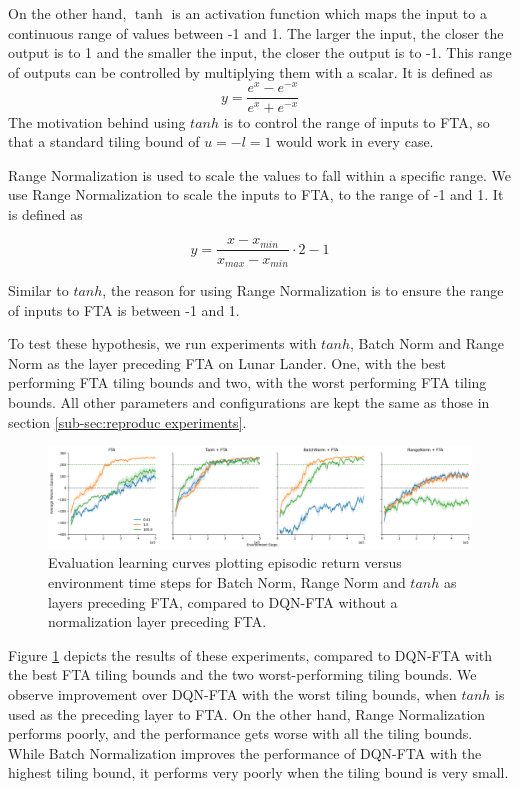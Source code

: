 \documentclass{article}
\begin{document}
On the other hand, $\tanh$ is an activation function which maps the input to a continuous range of values between -1 and 1.
The larger the input, the closer the output is to 1 and the smaller the input, the closer the output is to -1.
This range of outputs can be controlled by multiplying them with a scalar.
It is defined as
 \begin{equation}
    y = \frac{e^x-e^{-x}}{e^x+e^{-x}}
    \label{eq:tanh}
 \end{equation}
The motivation behind using $tanh$ is to control the range of inputs to FTA, so that a standard tiling bound of $u = -l = 1$ would work in every case.

Range Normalization is used to scale the values to fall within a specific range.
We use Range Normalization to scale the inputs to FTA, to the range of -1 and 1. It is defined as

 \begin{equation}
    y = \frac{x - x_{min}}{x_{max} - x_{min}} \cdot 2 - 1
    \label{eq:rangnorm}
 \end{equation}

 Similar to $tanh$, the reason for using Range Normalization is to ensure the range of inputs to FTA is between -1 and 1.

To test these hypothesis, we run experiments with $tanh$, Batch Norm and Range Norm as the layer preceding FTA on Lunar Lander.
One, with the best performing FTA tiling bounds and two, with the worst performing FTA tiling bounds.
All other parameters and configurations are kept the same as those in section \ref{sub-sec:reproduc experiments}.

\begin{figure}[h]
    \centering
    \includegraphics[width=12cm]{normalizing.png}
    \caption{Evaluation learning curves plotting episodic return versus environment time steps for Batch Norm, Range Norm and $tanh$ as layers preceding FTA, compared to DQN-FTA without a normalization layer preceding FTA.}
    \label{fig:bnvtanh}
\end{figure}

Figure \ref{fig:bnvtanh} depicts the results of these experiments, compared to DQN-FTA with the best FTA tiling bounds and the two worst-performing tiling bounds. We observe improvement over DQN-FTA with the worst tiling bounds, when $tanh$ is used as the preceding layer to FTA. On the other hand, Range Normalization performs poorly, and the performance gets worse with all the tiling bounds. While Batch Normalization improves the performance of DQN-FTA with the highest tiling bound, it performs very poorly when the tiling bound is very small.
\end{document}
